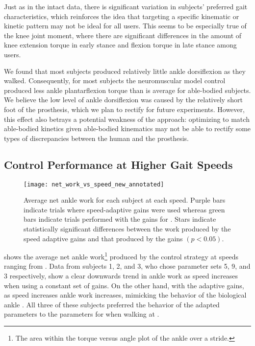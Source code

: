 Just as in the intact data, there is significant variation in subjects'
preferred gait characteristics, which reinforces the idea that targeting a
specific kinematic or kinetic pattern may not be ideal for all users. This seems
to be especially true of the knee joint moment, where there are significant
differences in the amount of knee extension torque in early stance and flexion
torque in late stance among users. 

We found that most subjects produced relatively little ankle dorsiflexion as
they walked. Consequently, for most subjects the neuromuscular model control
produced less ankle plantarflexion torque than is average for able-bodied
subjects.  We believe the low level of ankle dorsiflexion was caused by the
relatively short foot of the prosthesis, which we plan to rectify for future
experiments. However, this effect also betrays a potential weakness of the
approach: optimizing to match able-bodied kinetics given able-bodied kinematics
may not be able to rectify some types of discrepancies between the human and
the prosthesis.

\subsection{Control Performance at Higher Gait Speeds}
\begin{figure}
    \centering
    \texttt{[image: net\_work\_vs\_speed\_new\_annotated]}
    \caption[Average net ankle work for each subject at each speed]{Average net
    ankle work for each subject at each speed. Purple bars indicate trials where
    speed-adaptive gains were used whereas green bars indicate trials performed
    with the gains for . Stars indicate statistically
    significant differences between the work produced by the speed adaptive
    gains and that produced by the  gains $(p <
    0.05)$.}\label{fig:net_work_vs_speed}
\end{figure}

 shows the average net ankle work\footnote{The area
within the torque versus angle plot of the ankle over a stride.} produced by the
control strategy at speeds ranging from . Data from
subjects 1, 2, and 3, who chose parameter sets 5, 9, and 3 respectively, show a
clear downwards trend in ankle work as speed increases when using a constant set
of gains. On the other hand, with the adaptive gains, as speed increases ankle
work increases, mimicking the behavior of the biological ankle
\citep{herr2012bionic}. All three of these subjects preferred the behavior of
the adapted parameters to the parameters for  when walking
at .

